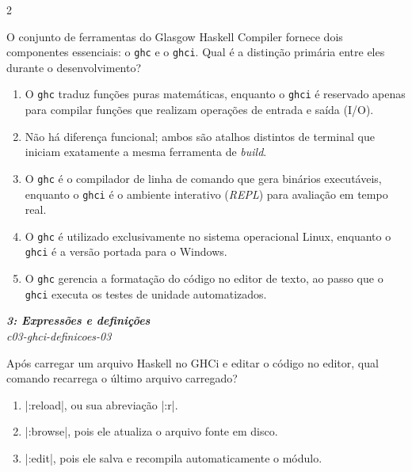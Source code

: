 \documentclass[a4paper,10pt,brazil]{article}
\begin{document}
\begin{multicols}{2}
\begin{flushright}
\end{flushright}
O conjunto de ferramentas do Glasgow Haskell Compiler fornece dois componentes essenciais: o \texttt{ghc} e o \texttt{ghci}. Qual é a distinção primária entre eles durante o desenvolvimento?

\begin{enumerate}
  \item O \texttt{ghc} traduz funções puras matemáticas, enquanto o \texttt{ghci} é reservado apenas para compilar funções que realizam operações de entrada e saída (I/O).

  \item Não há diferença funcional; ambos são atalhos distintos de terminal que iniciam exatamente a mesma ferramenta de \emph{build}.

  \item O \texttt{ghc} é o compilador de linha de comando que gera binários executáveis, enquanto o \texttt{ghci} é o ambiente interativo (\emph{REPL}) para avaliação em tempo real.

  \item O \texttt{ghc} é utilizado exclusivamente no sistema operacional Linux, enquanto o \texttt{ghci} é a versão portada para o Windows.

  \item O \texttt{ghc} gerencia a formatação do código no editor de texto, ao passo que o \texttt{ghci} executa os testes de unidade automatizados.


\end{enumerate}

\begin{flushright}
  \footnotesize
  \textit{\textbf{3: Expressões e definições}}\\
  \textit{c03-ghci-definicoes-03}\\

\end{flushright}
Após carregar um arquivo Haskell no GHCi e editar o código no editor, qual comando recarrega o último arquivo carregado?

\begin{enumerate}
  \item \haskellinline|:reload|, ou sua abreviação \haskellinline|:r|.

  \item \haskellinline|:browse|, pois ele atualiza o arquivo fonte em disco.

  \item \haskellinline|:edit|, pois ele salva e recompila automaticamente o módulo.


\end{enumerate}
\end{multicols}
\end{document}
